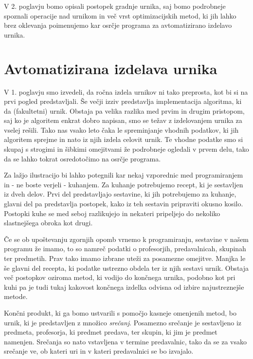 \documentclass[10pt,a4paper]{article}
\begin{document}
V 2. poglavju bomo opisali postopek gradnje urnika, saj bomo podrobneje spoznali
operacije nad urnikom in več vrst optimizacijskih metod, ki jih lahko brez oklevanja
poimenujemo kar osrčje programa za avtomatizirano izdelavo urnika.

\section{Avtomatizirana izdelava urnika}

V 1. poglavju smo izvedeli, da ročna izdela urnikov ni tako preprosta, kot bi si
na prvi pogled predstavljali. Še večji izziv predstavlja implementacija algoritma, ki da
(fakultetni) urnik. Obstaja pa velika razlika med prvim in drugim pristopom, saj ko je
algoritem enkrat dobro napisan, smo se težav z izdelovanjem urnika za vselej rešili.
Tako nas vsako leto čaka le spreminjanje vhodnih podatkov, ki jih algoritem sprejme in
nato iz njih izdela celovit urnik. Te vhodne podatke smo si skupaj s strogimi in šibkimi
omejitvami že podrobneje ogledali v prvem delu, tako da se lahko tokrat osredotočimo na
osrčje programa.

Za lažjo ilustracijo bi lahko potegnili kar nekaj vzporednic med programiranjem in - ne
boste verjeli - kuhanjem. Za kuhanje potrebujemo recept, ki je sestavljen iz dveh delov.
Prvi del predstavljajo sestavine, ki jih potrebujemo za kuhanje, glavni del pa predstavlja
postopek, kako iz teh sestavin pripraviti okusno kosilo. Postopki kuhe se med seboj
razlikujejo in nekateri pripeljejo do nekoliko slastnejšega obroka kot drugi.

Če se ob upoštevanju zgornjih opomb vrnemo k programiranju, sestavine v našem programu že
imamo, to so namreč podatki o profesorjih, predavalnicah, skupinah ter predmetih. Prav tako
imamo izbrane uteži za posamezne omejitve. Manjka le še glavni del recepta, ki podatke
ustrezno obdela ter iz njih sestavi urnik. Obstaja več postopkov oziroma metod, ki vodijo
do končnega urnika, podobno kot pri kuhi pa je tudi tukaj kakovost končnega izdelka odvisna
od izbire najustreznejše metode.

Končni produkt, ki ga bomo ustvarili s pomočjo kasneje omenjenih metod, bo urnik, ki je
predstavljen z množico \emph{srečanj}. Posamezno srečanje je sestavljeno iz predmeta,
profesorja, ki predmet predava, ter skupin, ki jim je predmet namenjen. Srečanja so nato
vstavljena v termine predavalnic, tako da se za vsako srečanje ve, ob kateri uri in v
kateri predavalnici se bo izvajalo.
\end{document}
